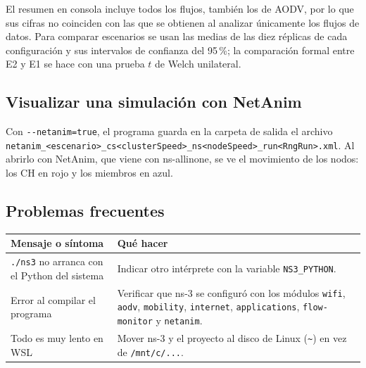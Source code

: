 El resumen en consola incluye todos los flujos, también los de AODV, por lo que sus
cifras no coinciden con las que se obtienen al analizar únicamente los flujos de datos.
Para comparar escenarios se usan las medias de las diez réplicas de cada configuración y
sus intervalos de confianza del 95\,\%; la comparación formal entre E2 y E1 se hace con
una prueba $t$ de Welch unilateral.

\subsection{Visualizar una simulación con NetAnim}

{\sloppy
Con \texttt{-{}-netanim=true}, el programa guarda en la carpeta de salida el archivo
\texttt{netanim\_\allowbreak{}<escenario>\_\allowbreak{}cs<clusterSpeed>\_\allowbreak{}ns<nodeSpeed>\_\allowbreak{}run<RngRun>.xml}. Al
abrirlo con NetAnim, que viene con ns-allinone, se ve el movimiento de los nodos: los CH
en rojo y los miembros en azul.\par}

\subsection{Problemas frecuentes}

\begin{center}
\small
\begin{tabular}{p{5.2cm}p{7.4cm}}
\toprule
\textbf{Mensaje o síntoma} & \textbf{Qué hacer} \\
\midrule
\texttt{./ns3} no arranca con el Python del sistema & Indicar otro intérprete con la variable \texttt{NS3\_\allowbreak{}PYTHON}. \\
Error al compilar el programa & Verificar que ns-3 se configuró con los módulos \texttt{wifi}, \texttt{aodv}, \texttt{mobility}, \texttt{internet}, \texttt{applications}, \texttt{flow-monitor} y \texttt{netanim}. \\
Todo es muy lento en WSL & Mover ns-3 y el proyecto al disco de Linux (\texttt{\textasciitilde}) en vez de \texttt{/mnt/c/...}. \\
\bottomrule
\end{tabular}
\end{center}
